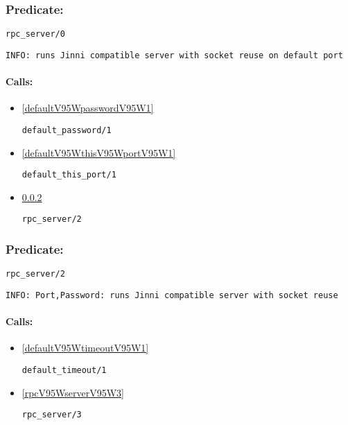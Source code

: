 \subsubsection{Predicate:} \label{rpcV95WserverV95W0}

\begin{verbatim}
rpc_server/0
\end{verbatim}

{\small \begin{verbatim}
INFO: runs Jinni compatible server with socket reuse on default port

\end{verbatim}}
\paragraph{Calls:} 
\begin{itemize}
\item \ref{defaultV95WpasswordV95W1} 
\begin{verbatim}
default_password/1
\end{verbatim}

\item \ref{defaultV95WthisV95WportV95W1} 
\begin{verbatim}
default_this_port/1
\end{verbatim}

\item \ref{rpcV95WserverV95W2} 
\begin{verbatim}
rpc_server/2
\end{verbatim}

\end{itemize}

\subsubsection{Predicate:} \label{rpcV95WserverV95W2}

\begin{verbatim}
rpc_server/2
\end{verbatim}

{\small \begin{verbatim}
INFO: Port,Password: runs Jinni compatible server with socket reuse

\end{verbatim}}
\paragraph{Calls:} 
\begin{itemize}
\item \ref{defaultV95WtimeoutV95W1} 
\begin{verbatim}
default_timeout/1
\end{verbatim}

\item \ref{rpcV95WserverV95W3} 
\begin{verbatim}
rpc_server/3
\end{verbatim}

\end{itemize}
